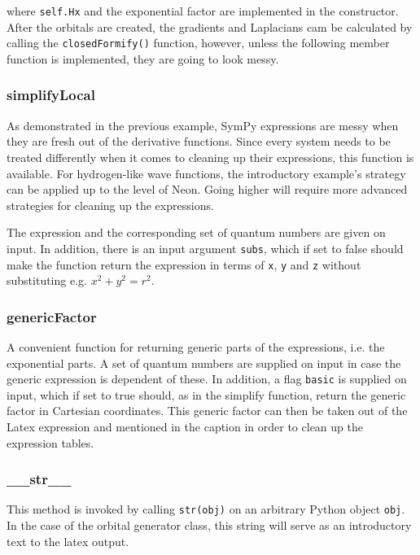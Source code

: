 where \verb+self.Hx+ and the exponential factor are implemented in the constructor. After the orbitals are created, the gradients and Laplacians cam be calculated by calling the \verb+closedFormify()+ function, however, unless the following member function is implemented, they are going to look messy.

\subsubsection{simplifyLocal}

As demonstrated in the previous example, SymPy expressions are messy when they are fresh out of the derivative functions. Since every system needs to be treated differently when it comes to cleaning up their expressions, this function is available. For hydrogen-like wave functions, the introductory example's strategy can be applied up to the level of Neon. Going higher will require more advanced strategies for cleaning up the expressions.

The expression and the corresponding set of quantum numbers are given on input. In addition, there is an input argument \verb+subs+, which if set to false should make the function return the expression in terms of \verb+x+, \verb+y+ and \verb+z+ without substituting e.g. $x^2 + y^2 = r^2$.

\subsubsection{genericFactor}

A convenient function for returning generic parts of the expressions, i.e. the exponential parts. A set of quantum numbers are supplied on input in case the generic expression is dependent of these. In addition, a flag \verb+basic+ is supplied on input, which if set to true should, as in the simplify function, return the generic factor in Cartesian coordinates. This generic factor can then be taken out of the Latex expression and mentioned in the caption in order to clean up the expression tables.

\subsubsection{\_\_str\_\_}

This method is invoked by calling \verb+str(obj)+ on an arbitrary Python object \verb+obj+. In the case of the orbital generator class, this string will serve as an introductory text to the latex output.

